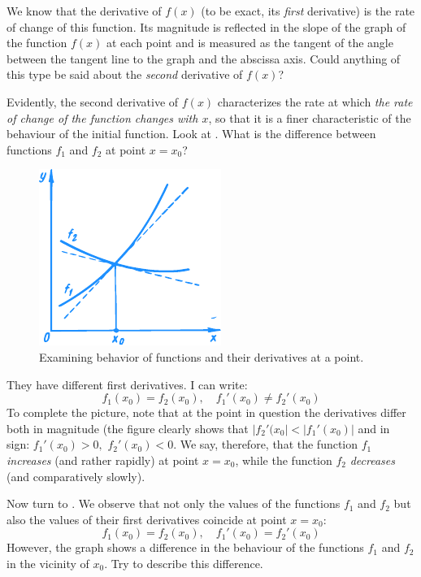 \rdr We know that the derivative of $f (x)$ (to be exact, its \emph{first} derivative) is the rate of change of this function. Its magnitude is reflected in the slope of the graph of the function $f (x)$ at each point and is measured as the tangent of the angle between the tangent line to the graph and the abscissa axis. Could anything of this type be said about the \emph{second} derivative of $f (x)$?
 
\athr Evidently, the second derivative of $f (x)$ characterizes the rate at which \emph{the rate of change of the function changes with $x$}, so that it is a finer characteristic of the behaviour of the initial function. Look at . What is the difference between functions $f_{1}$ and $f_{2}$ at point $x = x_{0}$?


\begin{figure}[!ht]%
\centering
\includegraphics[width=.6\textwidth]{figures/fig-53.pdf} 
\caption{Examining behavior of functions and their derivatives at a point.}
\label{fig-53}
\end{figure}


\rdr They have different first derivatives. I can write:
\begin{equation*}%
f_{1} (x_{0}) = f_{2} (x_{0}), \quad	f_{1}' (x_{0}) \neq f_{2}' (x_{0})
\end{equation*}
\athr To complete the picture, note that at the point in question the derivatives differ both in magnitude (the figure clearly shows that $| f_{2}' (x_{0}| < |f_{1}' (x_{0})|$ and in sign: $ f_{1}' (x_{0}) >0, \,\, f_{2}' (x_{0}) < 0$. We say, therefore, that the function $f_{1}$ \emph{increases} (and rather rapidly) at point $x = x_{0}$, while the function $f_{2}$ \emph{decreases} (and comparatively slowly).

Now turn to . We observe that not only the values of the functions $f_{1}$ and $f_{2}$ but also the values of their first derivatives coincide at point  $x = x_{0}$:
\begin{equation*}%
f_{1} (x_{0}) = f_{2} (x_{0}), \quad	f_{1}' (x_{0}) = f_{2}' (x_{0})
\end{equation*}
However, the graph shows a difference in the behaviour of the functions $f_{1}$ and $f_{2}$ in the vicinity of $ x_{0}$. Try to describe this difference.

